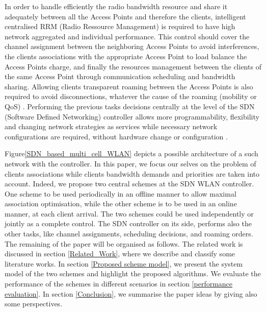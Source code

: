 \documentclass[journal,transmag]{IEEEtran}
\begin{document}
In order to handle efficiently the radio bandwidth resource and share it adequately between all the Access Points and therefore the clients, intelligent centralised RRM (Radio Ressource Management) is required to have high network aggregated and individual performance. This control should cover the channel assignment between the neighboring Access Points to avoid interferences, the clients associations with the appropriate Access Point to load balance the Access Points charge, and finally the resources management between the clients of the same Access Point through communication scheduling and bandwidth sharing. Allowing clients transparent roaming between the Access Points is also required to avoid disconnections, whatever the cause of the roaming (mobility or QoS) \cite{14optimalAP_INFOCOM,14Odin:Programmatic_Orchestration_WiFi}. Performing the previous tasks decisions centrally at the level of the SDN (Software Defined Networking) controller allows more programmability, flexibility and changing network strategies as services while necessary network configurations are required, without hardware change or configuration \cite{14Odin:Programmatic_Orchestration_WiFi}. 

Figure\ref{SDN_based_multi_cell_WLAN} depicts a possible architecture of a such network with the controller. In this paper, we focus our selves on the problem of clients associations while clients bandwidth demands and priorities are taken into account. Indeed, we propose two central schemes at the SDN WLAN controller. One scheme to be used periodically in an offline manner to allow maximal association optimisation, while the other scheme is to be used in an online manner, at each client arrival. The two schemes could be used independently or jointly as a complete control. The SDN controller on its side, performs also the other tasks, like channel assignments, scheduling decisions, and roaming orders.     
The remaining of the paper will be organised as follows. The related work is discussed in section \ref{Related_Work}, where we describe and classify some literature works. In section \ref{Proposed scheme model}, we present the system model of the two schemes and highlight the proposed algorithms. We evaluate the performance of the schemes in different scenarios in section \ref{performance evaluation}. In section \ref{Conclusion}, we summarise the paper ideas by giving also some perspectives. 
\end{document}
